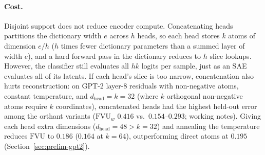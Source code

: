 \paragraph{Cost.}
Disjoint support does not reduce encoder compute. Concatenating heads
partitions the dictionary width $e$ across $h$ heads, so each head
stores $k$ atoms of dimension $e/h$ ($h$ times fewer dictionary
parameters than a summed layer of width $e$), and a hard forward pass in
the dictionary reduces to $h$ slice lookups. However, the classifier
still evaluates all $hk$ logits per sample, just as an SAE evaluates all
of its latents. If each head's slice is too narrow, concatenation also
hurts reconstruction: on GPT-2 layer-8 residuals with non-negative atoms,
constant temperature, and $d_{\mathrm{head}}{=}k{=}32$ (where $k$
orthogonal non-negative atoms require $k$ coordinates), concatenated
heads had the highest held-out error among the orthant variants
($\mathrm{FVU}_w$ $0.416$ vs.\ $0.154$--$0.293$; working notes). Giving
each head extra dimensions ($d_{\mathrm{head}}{=}48 > k{=}32$) and
annealing the temperature reduces $\mathrm{FVU}$ to $0.186$ ($0.164$ at
$k{=}64$), outperforming direct atoms at $0.195$
(Section~\ref{sec:prelim-gpt2}).


